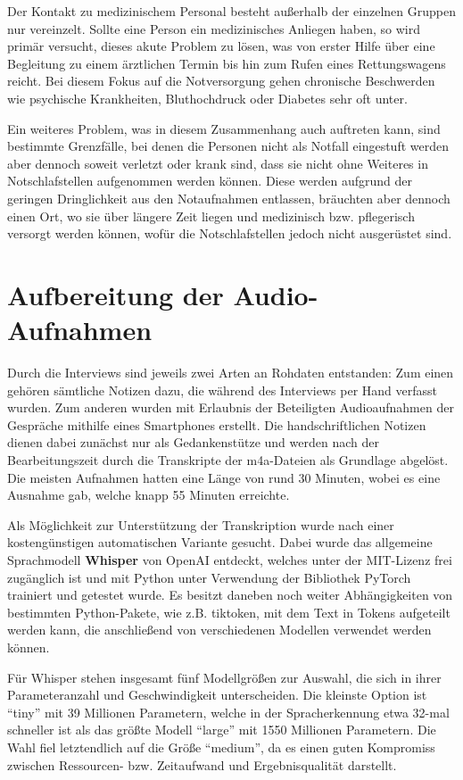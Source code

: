 Der Kontakt zu medizinischem Personal besteht außerhalb der einzelnen Gruppen nur vereinzelt. Sollte eine Person ein medizinisches Anliegen haben, so wird primär versucht, dieses akute Problem zu lösen, was von erster Hilfe über eine Begleitung zu einem ärztlichen Termin bis hin zum Rufen eines Rettungswagens reicht. Bei diesem Fokus auf die Notversorgung gehen chronische Beschwerden wie psychische Krankheiten, Bluthochdruck oder Diabetes sehr oft unter.

Ein weiteres Problem, was in diesem Zusammenhang auch auftreten kann, sind bestimmte Grenzfälle, bei denen die Personen nicht als Notfall eingestuft werden aber dennoch soweit verletzt oder krank sind, dass sie nicht ohne Weiteres in Notschlafstellen aufgenommen werden können. Diese werden aufgrund der geringen Dringlichkeit aus den Notaufnahmen entlassen, bräuchten aber dennoch einen Ort, wo sie über längere Zeit liegen und medizinisch bzw. pflegerisch versorgt werden können, wofür die Notschlafstellen jedoch nicht ausgerüstet sind. 


\section{Aufbereitung der Audio-Aufnahmen}\label{sec:audio}

Durch die Interviews sind jeweils zwei Arten an Rohdaten entstanden: Zum einen gehören sämtliche Notizen dazu, die während des Interviews per Hand verfasst wurden. Zum anderen wurden mit Erlaubnis der Beteiligten Audioaufnahmen der Gespräche mithilfe eines Smartphones erstellt. Die handschriftlichen Notizen dienen dabei zunächst nur als Gedankenstütze und werden nach der Bearbeitungszeit durch die Transkripte der m4a-Dateien als Grundlage abgelöst. Die meisten Aufnahmen hatten eine Länge von rund 30 Minuten, wobei es eine Ausnahme gab, welche knapp 55 Minuten erreichte.

Als Möglichkeit zur Unterstützung der Transkription wurde nach einer kostengünstigen automatischen Variante gesucht. Dabei wurde das allgemeine Sprachmodell \textbf{Whisper} von OpenAI entdeckt, welches unter der MIT-Lizenz frei zugänglich ist und mit Python unter Verwendung der Bibliothek PyTorch trainiert und getestet wurde. Es besitzt daneben noch weiter Abhängigkeiten von bestimmten Python-Pakete, wie z.B. tiktoken, mit dem Text in Tokens aufgeteilt werden kann, die anschließend von verschiedenen Modellen verwendet werden können.

Für Whisper stehen insgesamt fünf Modellgrößen zur Auswahl, die sich in ihrer Parameteranzahl und Geschwindigkeit unterscheiden. Die kleinste Option ist \enquote{tiny} mit 39 Millionen Parametern, welche in der Spracherkennung etwa 32-mal schneller ist als das größte Modell \enquote{large} mit 1550 Millionen Parametern. Die Wahl fiel letztendlich auf die Größe \enquote{medium}, da es einen guten Kompromiss zwischen Ressourcen- bzw. Zeitaufwand und Ergebnisqualität darstellt.

